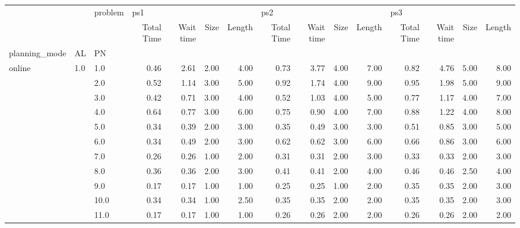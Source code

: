 \begin{tabular}{lllrrrrrrrrrrrr}
\toprule
       &     & problem & \multicolumn{4}{l}{ps1} & \multicolumn{4}{l}{ps2} & \multicolumn{4}{l}{ps3} \\
       &     & {} & Total Time & Wait time & Size & Length & Total Time & Wait time & Size & Length & Total Time & Wait time & Size & Length \\
planning\_mode & AL & PN &            &           &      &        &            &           &      &        &            &           &      &        \\
\midrule
online & 1.0 & 1.0  &       0.46 &      2.61 & 2.00 &   4.00 &       0.73 &      3.77 & 4.00 &   7.00 &       0.82 &      4.76 & 5.00 &   8.00 \\
       &     & 2.0  &       0.52 &      1.14 & 3.00 &   5.00 &       0.92 &      1.74 & 4.00 &   9.00 &       0.95 &      1.98 & 5.00 &   9.00 \\
       &     & 3.0  &       0.42 &      0.71 & 3.00 &   4.00 &       0.52 &      1.03 & 4.00 &   5.00 &       0.77 &      1.17 & 4.00 &   7.00 \\
       &     & 4.0  &       0.64 &      0.77 & 3.00 &   6.00 &       0.75 &      0.90 & 4.00 &   7.00 &       0.88 &      1.22 & 4.00 &   8.00 \\
       &     & 5.0  &       0.34 &      0.39 & 2.00 &   3.00 &       0.35 &      0.49 & 3.00 &   3.00 &       0.51 &      0.85 & 3.00 &   5.00 \\
       &     & 6.0  &       0.34 &      0.49 & 2.00 &   3.00 &       0.62 &      0.62 & 3.00 &   6.00 &       0.66 &      0.86 & 3.00 &   6.00 \\
       &     & 7.0  &       0.26 &      0.26 & 1.00 &   2.00 &       0.31 &      0.31 & 2.00 &   3.00 &       0.33 &      0.33 & 2.00 &   3.00 \\
       &     & 8.0  &       0.36 &      0.36 & 2.00 &   3.00 &       0.41 &      0.41 & 2.00 &   4.00 &       0.46 &      0.46 & 2.50 &   4.00 \\
       &     & 9.0  &       0.17 &      0.17 & 1.00 &   1.00 &       0.25 &      0.25 & 1.00 &   2.00 &       0.35 &      0.35 & 2.00 &   3.00 \\
       &     & 10.0 &       0.34 &      0.34 & 1.00 &   2.50 &       0.35 &      0.35 & 2.00 &   2.00 &       0.35 &      0.35 & 2.00 &   3.00 \\
       &     & 11.0 &       0.17 &      0.17 & 1.00 &   1.00 &       0.26 &      0.26 & 2.00 &   2.00 &       0.26 &      0.26 & 2.00 &   2.00 \\

\end{tabular}
